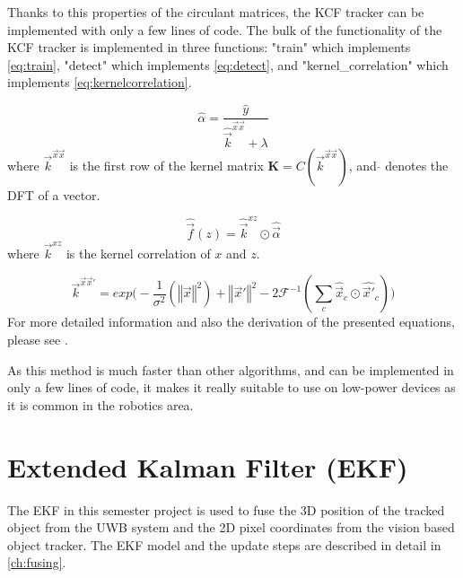 Thanks to this properties of the circulant matrices, the \ac{KCF} tracker can be implemented with only a few lines of code. The bulk of the functionality of the \ac{KCF} tracker is implemented in three functions: "train" which implements \autoref{eq:train}, "detect" which implements \autoref{eq:detect}, and "kernel\_correlation" which implements \autoref{eq:kernelcorrelation}.

\begin{equation}\label{eq:train}
	\hat{\alpha} = \frac{\hat{y}}{\hat{\vec{k}}^{\vec x \vec x} + \lambda}
\end{equation}
where $\vec{k}^{\vec x \vec x}$ is the first row of the kernel matrix $\textbf{K}=C(\vec{k}^{\vec x \vec x})$, and $\hat{}$ denotes the DFT of a vector.

\begin{equation}\label{eq:detect}
	\hat{\vec f}(z) = \hat{\vec k}^{xz} \odot \hat{\vec \alpha}
\end{equation}
where $\vec k^{xz}$ is the kernel correlation of $x$ and $z$.

\begin{equation}\label{eq:kernelcorrelation}
	\vec{k}^{\vec x\vec x'} = \mathit{exp} \big( -\frac{1}{\sigma^2} (\left\Vert \vec x \right\Vert^2) + \left\Vert \vec x' \right\Vert^2 -2\mathcal{F}^{-1}(\sum_c \hat{\vec x}_c \odot \hat{\vec x'}_c) \big)
\end{equation}
For more detailed information and also the derivation of the presented equations, please see \cite{henriques2015tracking}.

As this method is much faster than other algorithms, and can be implemented in only a few lines of code, it makes it really suitable to use on low-power devices as it is common in the robotics area.

\section{Extended Kalman Filter (EKF)}
The \acf{EKF} \cite{Chui2009} in this semester project is used to fuse the 3D position of the tracked object from the \ac{UWB} system and the 2D pixel coordinates from the vision based object tracker. The \ac{EKF} model and the update steps are described in detail in \autoref{ch:fusing}.